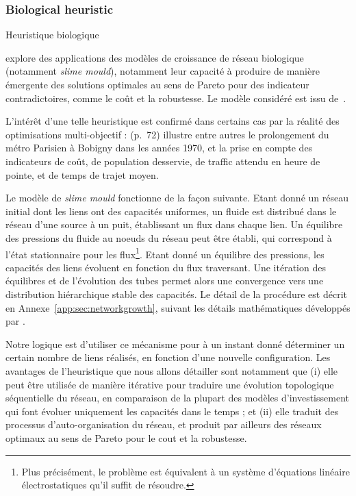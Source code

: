 \subsubsection{Biological heuristic}{Heuristique biologique}

\cite{raimbault2015labex} explore des applications des modèles de croissance de réseau biologique (notamment \emph{slime mould}), notamment leur capacité à produire de manière émergente des solutions optimales au sens de Pareto pour des indicateur contradictoires, comme le coût et la robustesse. Le modèle considéré est issu de~\cite{tero2010rules}.

L'intérêt d'une telle heuristique est confirmé dans certains cas par la réalité des optimisations multi-objectif : \cite{padeiro:tel-00438092} (p.~72) illustre entre autres le prolongement du métro Parisien à Bobigny dans les années 1970, et la prise en compte des indicateurs de coût, de population desservie, de traffic attendu en heure de pointe, et de temps de trajet moyen.

Le modèle de \emph{slime mould} fonctionne de la façon suivante. Etant donné un réseau initial dont les liens ont des capacités uniformes, un fluide est distribué dans le réseau d'une source à un puit, établissant un flux dans chaque lien. Un équilibre des pressions du fluide au noeuds du réseau peut être établi, qui correspond à l'état stationnaire pour les flux\footnote{Plus précisément, le problème est équivalent à un système d'équations linéaire électrostatiques qu'il suffit de résoudre.}. Etant donné un équilibre des pressions, les capacités des liens évoluent en fonction du flux traversant. Une itération des équilibres et de l'évolution des tubes permet alors une convergence vers une distribution hiérarchique stable des capacités. Le détail de la procédure est décrit en Annexe~\ref{app:sec:networkgrowth}, suivant les détails mathématiques développés par \cite{tero2007mathematical}.


Notre logique est d'utiliser ce mécanisme pour à un instant donné déterminer un certain nombre de liens réalisés, en fonction d'une nouvelle configuration. Les avantages de l'heuristique que nous allons détailler sont notamment que (i) elle peut être utilisée de manière itérative pour traduire une évolution topologique séquentielle du réseau, en comparaison de la plupart des modèles d'investissement qui font évoluer uniquement les capacités dans le temps ; et (ii) elle traduit des processus d'auto-organisation du réseau, et produit par ailleurs des réseaux optimaux au sens de Pareto pour le cout et la robustesse.


